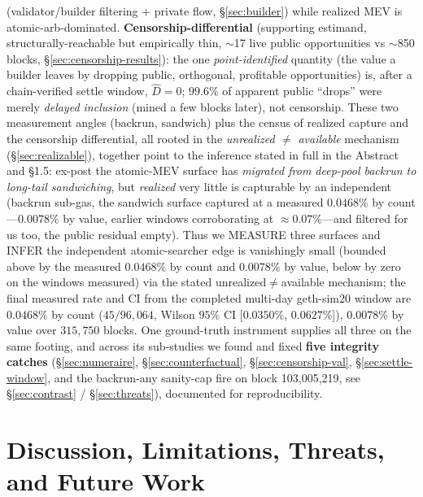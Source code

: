 \documentclass[11pt]{article}
\begin{document}
(validator/builder filtering $+$ private flow, \S\ref{sec:builder}) while realized MEV
is atomic-arb-dominated. \textbf{Censorship-differential} (supporting estimand,
structurally-reachable but empirically thin, $\sim$17 live public opportunities vs
$\sim$850 blocks, \S\ref{sec:censorship-results}): the one \emph{point-identified}
quantity (the value a builder leaves by dropping public, orthogonal, profitable
opportunities) is, after a chain-verified settle window, \textbf{$\hat D = 0$}; $99.6\%$ of apparent public ``drops'' were merely \emph{delayed
inclusion} (mined a few blocks later), not censorship. These two measurement angles (backrun, sandwich) plus the census of
realized capture and the censorship differential, all rooted in the \emph{unrealized
$\neq$ available} mechanism (\S\ref{sec:realizable}), together point to the inference
stated in full in the Abstract and \S1.5: ex-post the atomic-MEV surface has
\emph{migrated from deep-pool backrun to long-tail sandwiching}, but \emph{realized}
very little is capturable by an independent (backrun sub-gas, the sandwich surface
captured at a measured $0.0468\%$ by count---$0.0078\%$ by value, earlier windows corroborating at $\approx$$0.07\%$---and filtered for us too, the public residual empty). Thus we MEASURE three
surfaces and INFER the independent atomic-searcher edge is vanishingly small (bounded
above by the measured $0.0468\%$ by count and $0.0078\%$ by value,
below by zero on the windows measured) via the stated unrealized$\neq$available
mechanism; the final measured rate and CI from the completed multi-day geth-sim20 window are
$0.0468\%$ by count ($45/96{,}064$, Wilson $95\%$ CI [$0.0350\%$, $0.0627\%$]), $0.0078\%$ by value over $315{,}750$ blocks. One ground-truth instrument supplies all three on the same footing,
and across its sub-studies we found and fixed \textbf{five integrity catches}
(\S\ref{sec:numeraire}, \S\ref{sec:counterfactual}, \S\ref{sec:censorship-val},
\S\ref{sec:settle-window}, and the backrun-any sanity-cap fire on block
103{,}005{,}219, see \S\ref{sec:contrast} / \S\ref{sec:threats}), documented for
reproducibility.

\section{Discussion, Limitations, Threats, and Future Work}
\label{sec:discussion}
\end{document}

